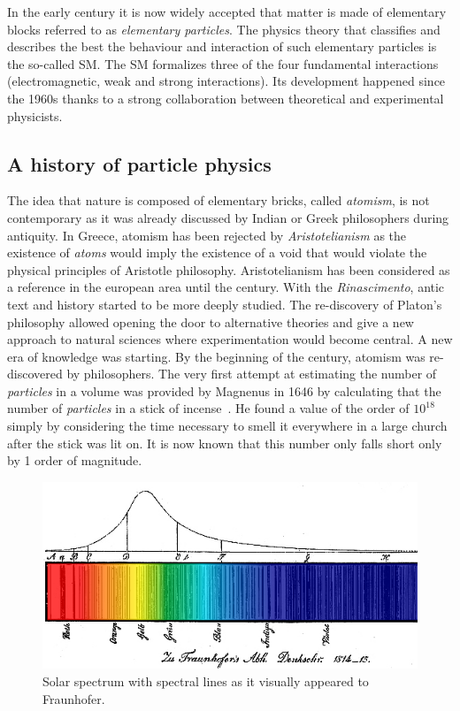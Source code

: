 	In the early  century it is now widely accepted that matter is made of elementary blocks referred to as \textit{elementary particles}. The physics theory that classifies and describes the best the behaviour and interaction of such elementary particles is the so-called \acl{SM}. The SM formalizes three of the four fundamental interactions (electromagnetic, weak and strong interactions). Its development happened since the 1960s thanks to a strong collaboration between theoretical and experimental physicists.

	\subsection{A history of particle physics}
	\label{chapt2:ssec:history}
	
	The idea that nature is composed of elementary bricks, called \textit{atomism}, is not contemporary as it was already discussed by Indian or Greek philosophers during antiquity. In Greece, atomism has been rejected by \textit{Aristotelianism} as the existence of \textit{atoms} would imply the existence of a void that would violate the physical principles of Aristotle philosophy. Aristotelianism has been considered as a reference in the european area until the  century. With the \textit{Rinascimento}, antic text and history started to be more deeply studied. The re-discovery of Platon's philosophy allowed opening the door to alternative theories and give a new approach to natural sciences where experimentation would become central. A new era of knowledge was starting. By the beginning of the  century, atomism was re-discovered by philosophers. The very first attempt at estimating the number of \textit{particles} in a volume was provided by Magnenus in 1646 by calculating that the number of \textit{particles} in a stick of incense~\cite{MAGNEGNUS1646}. He found a value of the order of $10^{18}$ simply by considering the time necessary to smell it everywhere in a large church after the stick was lit on. It is now known that this number only falls short only by 1 order of magnitude.

	\begin{figure}[H]
		\centering
		\includegraphics[width=0.7\linewidth]{fig/chapt2/Fraunhofer.jpg}
		\caption{\label{fig:spectral-lines} Solar spectrum with spectral lines as it visually appeared to Fraunhofer.}
	\end{figure}
	
